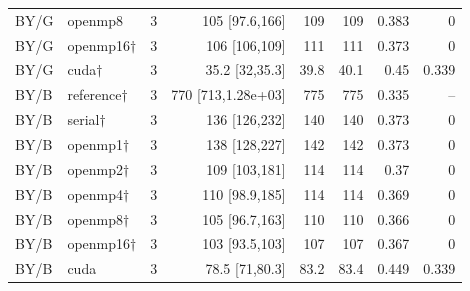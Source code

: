 \documentclass[11pt]{article}
\begin{document}
\begin{longtable}{llrrrrrr}
BY/G & openmp8 & 3 & 105 [97.6,166] & 109 & 109 & 0.383 & 0\\
BY/G & openmp16$\dagger$ & 3 & 106 [106,109] & 111 & 111 & 0.373 & 0\\
BY/G & cuda$\dagger$ & 3 & 35.2 [32,35.3] & 39.8 & 40.1 & 0.45 & 0.339\\
BY/B & reference$\dagger$ & 3 & 770 [713,1.28e+03] & 775 & 775 & 0.335 & --\\
BY/B & serial$\dagger$ & 3 & 136 [126,232] & 140 & 140 & 0.373 & 0\\
BY/B & openmp1$\dagger$ & 3 & 138 [128,227] & 142 & 142 & 0.373 & 0\\
BY/B & openmp2$\dagger$ & 3 & 109 [103,181] & 114 & 114 & 0.37 & 0\\
BY/B & openmp4$\dagger$ & 3 & 110 [98.9,185] & 114 & 114 & 0.369 & 0\\
BY/B & openmp8$\dagger$ & 3 & 105 [96.7,163] & 110 & 110 & 0.366 & 0\\
BY/B & openmp16$\dagger$ & 3 & 103 [93.5,103] & 107 & 107 & 0.367 & 0\\
BY/B & cuda & 3 & 78.5 [71,80.3] & 83.2 & 83.4 & 0.449 & 0.339\\
\bottomrule\end{longtable}\normalsize
\end{document}
